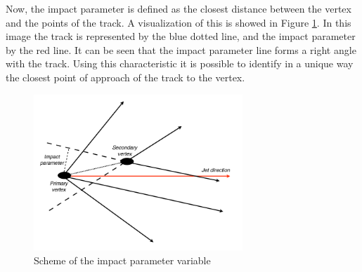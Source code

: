 Now, the impact parameter is defined as the closest distance between the vertex and the points of the track. A visualization of this is showed in Figure \ref{Impact_parameter}. In this image the track is represented by the blue dotted line, and the impact parameter by the red line. It can be seen that the impact parameter line forms a right angle with the track. Using this characteristic it is possible to identify in a unique way the closest point of approach of the track to the vertex.


 \begin{figure}[h] \label{Impact_parameter}
 \centering
 \caption{Scheme of the impact parameter variable}
 \includegraphics[width=0.7\textwidth]{./Capitulos/VariableDefinitions/Impact_parameter}  
 \end{figure} 

 
 
 
 
 
 
 
 
 
 
 
 
 
 
 
 
 
 
 